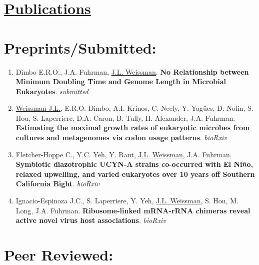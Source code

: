 \documentclass[]{res}
\begin{document}
\begin{resume}
\begin{itemize}[leftmargin=*]
\end{itemize} 

 
 \section{\underline{Publications}} \vspace{2mm}
 
 
 \section{Preprints/Submitted:} \vspace{0mm}
  
 \begin{enumerate}[leftmargin=*]
 \setlength\itemsep{0.25em}
 
\item Dimbo E.R.O., J.A. Fuhrman, \underline{J.L. Weissman}. {\bf No Relationship between Minimum Doubling Time and Genome Length in Microbial Eukaryotes}. \emph{submitted}
 
\item \underline{Weissman J.L.}, E.R.O. Dimbo, A.I. Krinos, C. Neely, Y. Yag\"{ues}, D. Nolin, S. Hou, S. Laperriere, D.A. Caron, B. Tully, H. Alexander, J.A. Fuhrman. {\bf Estimating the maximal growth rates of eukaryotic microbes from cultures and metagenomes via codon usage patterns}. \emph{bioRxiv}

\item Fletcher-Hoppe C., Y.C. Yeh, Y. Raut, \underline{J.L. Weissman}, J.A. Fuhrman. {\bf Symbiotic diazotrophic UCYN-A strains co-occurred with El Niño, relaxed upwelling, and varied eukaryotes over 10 years off Southern California Bight}. \emph{bioRxiv}

\item Ignacio-Espinoza J.C., S. Laperriere, Y. Yeh, \underline{J.L. Weissman}, S. Hou, M. Long, J.A. Fuhrman. {\bf Ribosome-linked mRNA-rRNA chimeras reveal active novel virus host associations}. \emph{bioRxiv}

  \end{enumerate} 
  
\newpage
  
 \section{Peer Reviewed:} \vspace{0mm}
 
\begin{enumerate}[leftmargin=*]
 \setlength\itemsep{0.25em}
 

\end{enumerate}
\end{resume}
\end{document}
